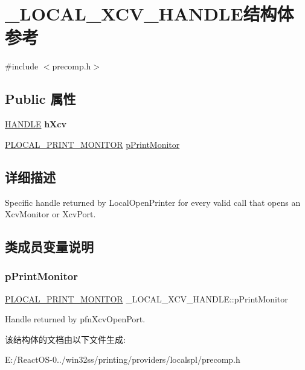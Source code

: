 \hypertarget{struct___l_o_c_a_l___x_c_v___h_a_n_d_l_e}{}\section{\+\_\+\+L\+O\+C\+A\+L\+\_\+\+X\+C\+V\+\_\+\+H\+A\+N\+D\+L\+E结构体 参考}
\label{struct___l_o_c_a_l___x_c_v___h_a_n_d_l_e}


{\ttfamily \#include $<$precomp.\+h$>$}

\subsection*{Public 属性}
\begin{DoxyCompactItemize}
\item 
\mbox{\label{struct___l_o_c_a_l___x_c_v___h_a_n_d_l_e_ac140a25534f7e5603d300753fbafd783}} 
\hyperlink{interfacevoid}{H\+A\+N\+D\+LE} {\bfseries h\+Xcv}
\item 
\hyperlink{struct___l_o_c_a_l___p_r_i_n_t___m_o_n_i_t_o_r}{P\+L\+O\+C\+A\+L\+\_\+\+P\+R\+I\+N\+T\+\_\+\+M\+O\+N\+I\+T\+OR} \hyperlink{struct___l_o_c_a_l___x_c_v___h_a_n_d_l_e_aa6843ae7ac494fbf4c974b12b58f878f}{p\+Print\+Monitor}
\end{DoxyCompactItemize}


\subsection{详细描述}
Specific handle returned by Local\+Open\+Printer for every valid call that opens an Xcv\+Monitor or Xcv\+Port. 

\subsection{类成员变量说明}
\mbox{\label{struct___l_o_c_a_l___x_c_v___h_a_n_d_l_e_aa6843ae7ac494fbf4c974b12b58f878f}} 
\subsubsection{\texorpdfstring{p\+Print\+Monitor}{pPrintMonitor}}
{\footnotesize\ttfamily \hyperlink{struct___l_o_c_a_l___p_r_i_n_t___m_o_n_i_t_o_r}{P\+L\+O\+C\+A\+L\+\_\+\+P\+R\+I\+N\+T\+\_\+\+M\+O\+N\+I\+T\+OR} \+\_\+\+L\+O\+C\+A\+L\+\_\+\+X\+C\+V\+\_\+\+H\+A\+N\+D\+L\+E\+::p\+Print\+Monitor}

Handle returned by pfn\+Xcv\+Open\+Port. 

该结构体的文档由以下文件生成\+:\begin{DoxyCompactItemize}
\item 
E\+:/\+React\+O\+S-\/0../win32ss/printing/providers/localspl/precomp.\+h\end{DoxyCompactItemize}
